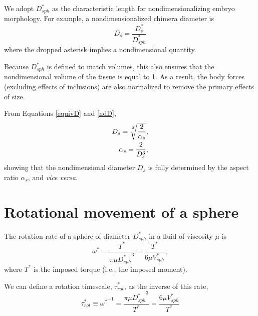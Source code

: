 \documentclass[10pt,a4paper]{article}
\def\non{\nonumber}
\begin{document}
We adopt $D_{sph}^*$ as the characteristic length for nondimensionalizing embryo morphology.
For example, a nondimensionalized chimera diameter is
\begin{equation}\label{ndD}
	D_s = \frac{D_s^*}{D_{sph}^*}
\end{equation} 
where the dropped asterisk implies a nondimensional quantity.

Because $D_{sph}^*$ is defined to match volumes, this also ensures that the nondimensional volume of the tissue is equal to 1.
As a result, the body forces (excluding effects of inclusions) are also normalized to remove the primary effects of size.

From Equations \ref{equivD} and \ref{ndD},
\begin{eqnarray}\label{equivD2}
	D_s = \sqrt[\uproot{5}3]{\frac{2}{\alpha_s}}, \non \\
	\alpha_s = \frac{2}{D_s^3},
\end{eqnarray}
showing that the nondimensional diameter $D_s$ is fully determined by the aspect ratio $\alpha_s$, and \textit{vice versa}.


\section{Rotational movement of a sphere}\label{RotSect}
The rotation rate of a sphere of diameter $D_{sph}^*$ in a fluid of viscosity $\mu$ is 
\begin{equation}\label{rot1}
	\omega^* = \frac{T^*}{\pi \mu {D_{sph}^*}^3} = \frac{T^*}{6 \mu V_{sph}^*},	
\end{equation}
where $T^*$ is the imposed torque (i.e., the imposed moment).

We can define a rotation timescale, $\tau_{rot}^*$, as the inverse of this rate,
\begin{equation}\label{tau1}
	\tau_{rot}^* \equiv {\omega^*}^{-1} = \frac{\pi \mu {D_{sph}^*}^3}{T^*} = \frac{6 \mu V_{sph}^*}{T^*}
\end{equation}
\end{document}
